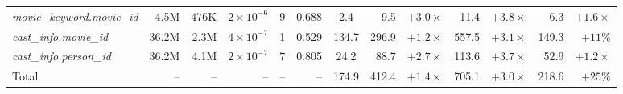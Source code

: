 \documentclass[10pt]{article}
\begin{document}
\begin{table}[!ht]
{\begin{tabular}{lrrrrr|c|rr|rr|rr}
    \textit{movie\_keyword.movie\_id}          & 4.5M  & 476K & $2\times10^{-6}$   & 9    & 0.688 & 2.4   & 9.5                & $+3.0\times$      & 11.4               & $+3.8\times$      & 6.3                 & $+1.6\times$ \\
    \textit{cast\_info.movie\_id}              & 36.2M & 2.3M & $4\times10^{-7}$   & 1    & 0.529 & 134.7 & 296.9              & $+1.2\times$      & 557.5              & $+3.1\times$      & 149.3               & $+11\%$ \\
    \textit{cast\_info.person\_id}             & 36.2M & 4.1M & $2\times10^{-7}$   & 7    & 0.805 & 24.2  & 88.7               & $+2.7\times$      & 113.6              & $+3.7\times$      & 52.9                & $+1.2\times$ \\
    \midrule
    Total & -- & -- & -- & -- & -- & 174.9 & 412.4 & $+1.4\times$ & 705.1 & $+3.0\times$ & 218.6 & $+25\%$ \\
    \bottomrule
  \end{tabular}%
  }
\end{table}
\end{document}
